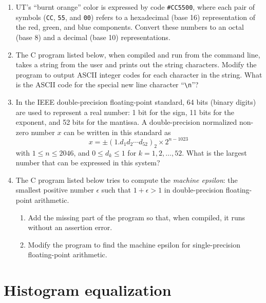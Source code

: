 \begin{enumerate}

\item UT's ``burnt orange'' color is expressed by code
  \texttt{\#CC5500}, where each pair of symbols (\texttt{CC},
  \texttt{55}, and \texttt{00}) refers to a hexadecimal (base 16)
  representation of the red, green, and blue components. Convert these
  numbers to an octal (base 8) and a decimal (base 10) representations.

\item The C program listed below, when compiled and
  run from the command line, takes a string from the user and prints
  out the string characters. Modify the program to output ASCII
  integer codes for each character in the string. What is the ASCII
  code for the special new line character ``\verb+\n+''?

\lstset{language=c,numbers=left,numberstyle=\tiny,showstringspaces=false}


\item In the IEEE double-precision floating-point standard, 64 bits
  (binary digits) are used to represent a real number: 1 bit for the
  sign, 11 bits for the exponent, and 52 bits for the mantissa. A
  double-precision normalized non-zero number $x$ can be written in
  this standard as 
  \[
  x = \pm (1.d_1d_2{\cdots}d_{52})_2 \times 2^{n-1023}\,
  \]
  with $1 \le n \le 2046$, and $0 \le d_k \le 1$ for
  $k=1,2,\ldots,52$. What is the largest number that can be expressed
  in this system?

\item The C program listed below tries to compute the \emph{machine
    epsilon}: the smallest positive number $\epsilon$ such that
  $1+\epsilon > 1$ in double-precision floating-point arithmetic. 

\begin{enumerate}
\item Add the missing part of the program so that, when compiled, it
  runs without an assertion error.
\item Modify the program to find the machine epsilon for single-precision floating-point arithmetic.
\end{enumerate}



\end{enumerate}


\section{Histogram equalization}

